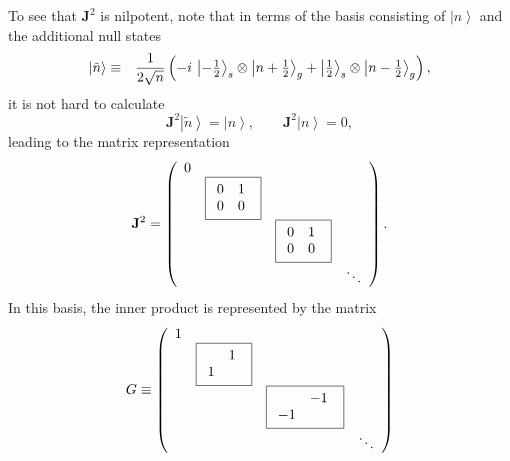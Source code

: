 \documentclass[a4paper,dvips,12pt]{article}
\newcommand {\hhalf} {{\textstyle{1 \over 2}}}
\newcommand {\ket}[1] {\left| #1 \right>}
\begin{document}
    To see that $\mathbf{J}^2$ is nilpotent,
    note that in terms of the basis consisting of $\ket{n}$ and the
    additional null states
    \begin{eqnarray}
        \ket{\tilde n} &\equiv& {1\over
        2\sqrt{n}}\left(-i\,\ket{-\hhalf}_s\otimes\ket{n+\hhalf}_g
                    +
                    \ket{\hhalf}_s\otimes\ket{n-\hhalf}_g\right),
                    \label{NTILDEN}
    \end{eqnarray}
    it is not hard to
    calculate
    \[
        \mathbf{J}^2 \ket{\tilde n} = \ket{n}, \qquad \mathbf{J}^2 \ket{n} = 0,
    \]
    leading to the matrix representation
    \begin{equation}
           \mathbf{J}^2 = \left(
                \begin{array}{cccc}
                        0 &  &  &  \\
                          & \fbox{\ensuremath{\begin{array}{rr}
                                    0 & 1 \\
                                    0 & 0
                                  \end{array}}
                            }
                             &  & \\
                          &  &
                            \fbox{\ensuremath{\begin{array}{rr}
                                    0 & 1  \\
                                    0 & 0
                                  \end{array}}
                            }
                                &  \\
                          &  &  &  \ddots
                \end{array}
            \right). \label{Q2}
    \end{equation}
    In this basis, the inner product is represented by the matrix
    \[
        G \equiv \left(
                \begin{array}{cccc}
                        1 &  &  &  \\
                          & \fbox{\ensuremath{\begin{array}{rr}
                                      & 1  \\
                                    1 &
                                  \end{array}}
                            }
                             &  & \\
                          &  &
                            \fbox{\ensuremath{\begin{array}{rr}
                                      & -1  \\
                                    -1 &
                                  \end{array}}
                            }
                                &  \\
                          &  &  &  \ddots
                \end{array}
            \right)
    \]
\end{document}

